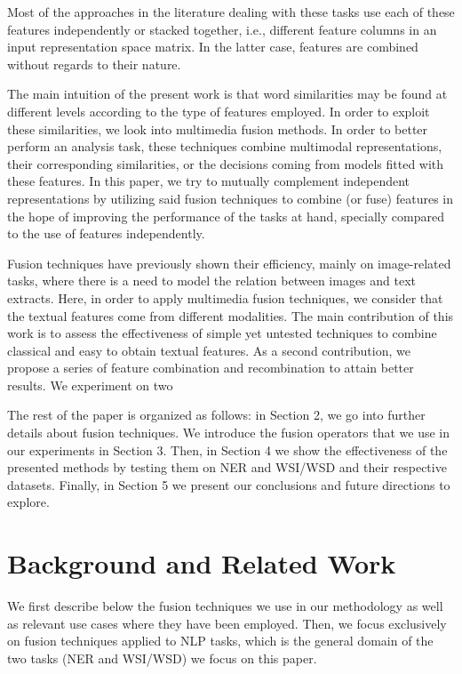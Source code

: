 \documentclass{llncs}
\begin{document}
Most of the approaches in the literature dealing with these tasks use each of these features independently or stacked together, i.e., different feature columns in an input representation space matrix. In the latter case, features are combined without regards to their nature. 

The main intuition of the present work is that word similarities may be found at different levels according to the type of features employed. In order to exploit these similarities, we look into multimedia fusion methods.  In order to better perform an analysis task, these techniques combine multimodal representations, their corresponding similarities, or the decisions coming from models fitted with these features. In this paper, we try to mutually complement independent representations by utilizing said fusion techniques to combine (or fuse) features in the hope of improving the performance of the tasks at hand, specially compared to the use of features independently. 

Fusion techniques have previously shown their efficiency, mainly on image-related tasks, where there is a need to model the relation  between images and text extracts.
%
%
Here, in order to apply multimedia fusion techniques, we consider that the textual features  come from different modalities. The main contribution of this work is to assess the effectiveness of simple yet untested techniques to combine classical and easy to obtain textual features. As a second contribution, we propose a series of feature combination and recombination to attain better results. We experiment on two 

The rest of the paper is organized as follows: in Section 2, we go into further details about fusion techniques. 
We introduce the fusion operators that we use in our experiments in Section 3. Then, in Section 4 we show the effectiveness of the presented methods by testing them on NER and WSI/WSD and their respective datasets. Finally, in Section 5 we present our conclusions and future directions to explore.

\section{Background and Related Work}
 
We first describe below the fusion techniques we use in our methodology as well as relevant use cases where they have been employed. Then, we focus exclusively on fusion techniques applied to NLP tasks, which is the general domain of the two tasks (NER and WSI/WSD) we focus on this paper.                                                                                                                 
\end{document}
